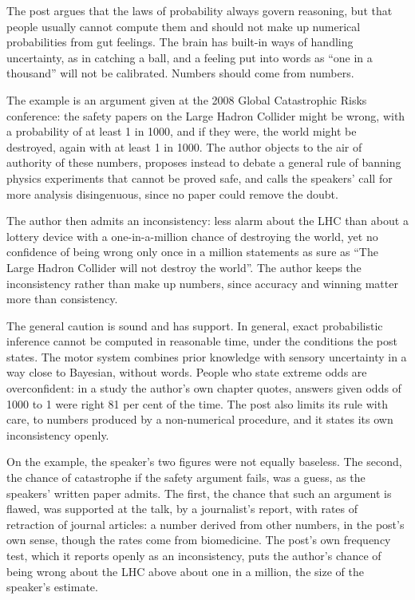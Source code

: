 \begin{afterword}
\summaryhead

The post argues that the laws of probability always govern reasoning, but that people usually cannot compute them and should not make up numerical probabilities from gut feelings. The brain has built-in ways of handling uncertainty, as in catching a ball, and a feeling put into words as ``one in a thousand'' will not be calibrated. Numbers should come from numbers.

The example is an argument given at the 2008 Global Catastrophic Risks conference: the safety papers on the Large Hadron Collider might be wrong, with a probability of at least 1 in 1000, and if they were, the world might be destroyed, again with at least 1 in 1000. The author objects to the air of authority of these numbers, proposes instead to debate a general rule of banning physics experiments that cannot be proved safe, and calls the speakers' call for more analysis disingenuous, since no paper could remove the doubt.

The author then admits an inconsistency: less alarm about the LHC than about a lottery device with a one-in-a-million chance of destroying the world, yet no confidence of being wrong only once in a million statements as sure as ``The Large Hadron Collider will not destroy the world''. The author keeps the inconsistency rather than make up numbers, since accuracy and winning matter more than consistency.

\responsehead

The general caution is sound and has support. In general, exact probabilistic inference cannot be computed in reasonable time, under the conditions the post states. The motor system combines prior knowledge with sensory uncertainty in a way close to Bayesian, without words. People who state extreme odds are overconfident: in a study the author's own chapter quotes, answers given odds of 1000 to 1 were right 81 per cent of the time. The post also limits its rule with care, to numbers produced by a non-numerical procedure, and it states its own inconsistency openly.

On the example, the speaker's two figures were not equally baseless. The second, the chance of catastrophe if the safety argument fails, was a guess, as the speakers' written paper admits. The first, the chance that such an argument is flawed, was supported at the talk, by a journalist's report, with rates of retraction of journal articles: a number derived from other numbers, in the post's own sense, though the rates come from biomedicine. The post's own frequency test, which it reports openly as an inconsistency, puts the author's chance of being wrong about the LHC above about one in a million, the size of the speaker's estimate.


\end{afterword}
